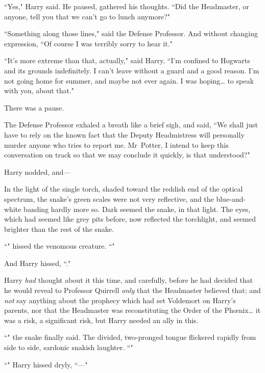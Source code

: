 ``Yes," Harry said. He paused, gathered his thoughts. ``Did the Headmaster, or anyone, tell you that we can't go to lunch anymore?"

``Something along those lines," said the Defense Professor. And without changing expression, ``Of course I was terribly sorry to hear it."

``It's more extreme than that, actually," said Harry. ``I'm confined to Hogwarts and its grounds indefinitely. I can't leave without a guard and a good reason. I'm not going home for summer, and maybe not ever again. I was hoping{\ldots} to speak with you, about that."

There was a pause.

The Defense Professor exhaled a breath like a brief sigh, and said, ``We shall just have to rely on the known fact that the Deputy Headmistress will personally murder anyone who tries to report me. Mr~Potter, I intend to keep this conversation on track so that we may conclude it quickly, is that understood?"

Harry nodded, and—

In the light of the single torch, shaded toward the reddish end of the optical spectrum, the snake's green scales were not very reflective, and the blue-and-white banding hardly more so. Dark seemed the snake, in that light. The eyes, which had seemed like grey pits before, now reflected the torchlight, and seemed brighter than the rest of the snake.

``" hissed the venomous creature. ``"

And Harry hissed, ``."

Harry \emph{had} thought about it this time, and carefully, before he had decided that he would reveal to Professor Quirrell \emph{only} that the Headmaster believed that; and \emph{not} say anything about the prophecy which had set Voldemort on Harry's parents, nor that the Headmaster was reconstituting the Order of the Phœnix{\ldots} it was a risk, a significant risk, but Harry needed an ally in this.

``" the snake finally said. The divided, two-pronged tongue flickered rapidly from side to side, sardonic snakish laughter. ``"

``" Harry hissed dryly, ``—"

